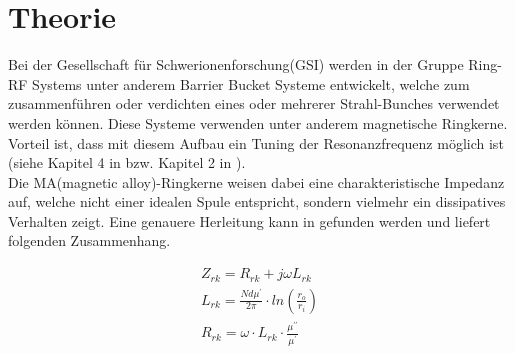 \section{Theorie}

Bei der Gesellschaft für Schwerionenforschung(GSI) werden in der Gruppe Ring-RF Systems unter anderem  Barrier Bucket Systeme entwickelt, welche zum zusammenf\"uhren oder verdichten eines oder mehrerer Strahl-Bunches verwendet werden k\"onnen. Diese Systeme verwenden unter anderem magnetische Ringkerne. Vorteil ist, dass mit diesem Aufbau ein Tuning der Resonanzfrequenz m\"oglich ist (siehe Kapitel 4 in \cite{Klingbeil2015} bzw. Kapitel 2 in \cite{bast2017ba}).\\

Die MA(magnetic alloy)-Ringkerne weisen dabei eine charakteristische Impedanz auf, welche nicht einer idealen Spule entspricht, sondern vielmehr ein dissipatives Verhalten zeigt. Eine genauere Herleitung kann in \cite{Klingbeil2015} gefunden werden und liefert folgenden Zusammenhang. 


\begin{align}
Z_{rk} = R_{rk} + j\omega L_{rk}\label{eq_01}\\
L_{rk} = \frac{Nd\mu^\prime}{2\pi}\cdot ln(\frac{r_o}{r_i})\label{eq_02}\\
R_{rk} = \omega\cdot L_{rk}\cdot\frac{\mu^{\prime\prime}}{\mu^{\prime}}\label{eq_03}
\end{align}



